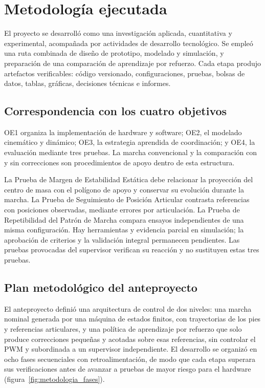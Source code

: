 \chapter{Metodología ejecutada}

El proyecto se desarrolló como una investigación aplicada, cuantitativa y
experimental, acompañada por actividades de desarrollo tecnológico. Se empleó
una ruta combinada de diseño de prototipo, modelado y simulación, y preparación
de una comparación de aprendizaje por refuerzo. Cada etapa produjo artefactos
verificables: código versionado, configuraciones, pruebas, bolsas de datos,
tablas, gráficas, decisiones técnicas e informes.

\section{Correspondencia con los cuatro objetivos}

OE1 organiza la implementación de hardware y software; OE2, el modelado
cinemático y dinámico; OE3, la estrategia aprendida de coordinación; y OE4,
la evaluación mediante tres pruebas. La marcha convencional y la comparación
con y sin correcciones son procedimientos de apoyo dentro de esta estructura.

La Prueba de Margen de Estabilidad Estática debe relacionar la proyección del
centro de masa con el polígono de apoyo y conservar su evolución durante la
marcha. La Prueba de Seguimiento de Posición Articular contrasta referencias
con posiciones observadas, mediante errores por articulación. La Prueba de
Repetibilidad del Patrón de Marcha compara ensayos independientes de una misma
configuración. Hay herramientas y evidencia parcial en simulación; la aprobación
de criterios y la validación integral permanecen pendientes. Las pruebas
provocadas del supervisor verifican su reacción y no sustituyen estas tres pruebas.

\section{Plan metodológico del anteproyecto}

El anteproyecto definió una arquitectura de control de dos niveles: una marcha
nominal generada por una máquina de estados finitos, con trayectorias de los
pies y referencias articulares, y una política de aprendizaje por refuerzo que
solo produce correcciones pequeñas y acotadas sobre esas referencias, sin
controlar el PWM y subordinada a un supervisor independiente. El desarrollo se
organizó en ocho fases secuenciales con retroalimentación, de modo que cada
etapa superara sus verificaciones antes de avanzar a pruebas de mayor riesgo
para el hardware (figura~\ref{fig:metodologia_fases}).

